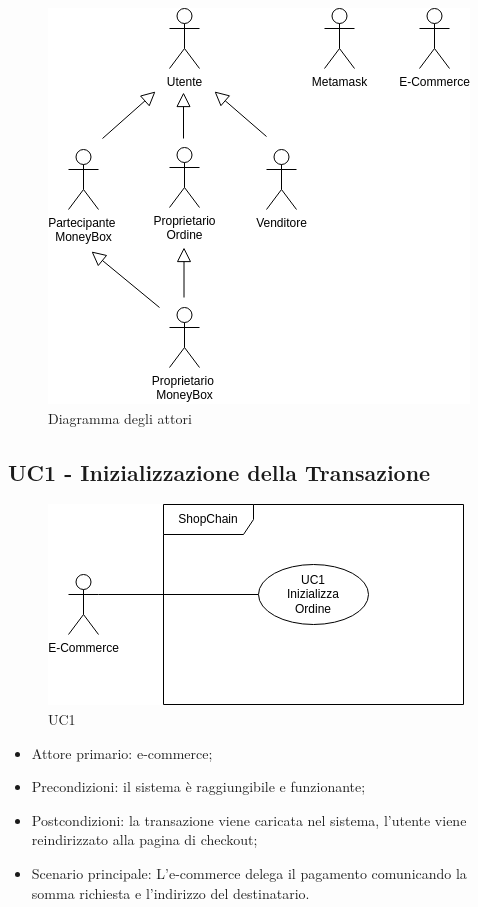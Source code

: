 \begin{figure}[H]
    \centering
    \includegraphics[scale=0.7]{immagini/Attori.png}
    \caption{Diagramma degli attori}
\end{figure}

\subsection{UC1 - Inizializzazione della Transazione}\label{subsection: UC1}

\begin{figure}[H]
    \centering
    \includegraphics[scale=0.9]{immagini/UC1.png}
    \caption{UC1}
\end{figure}

\begin{itemize}
    \item Attore primario: e-commerce\glo{};
    \item Precondizioni: il sistema è raggiungibile e funzionante;
    \item Postcondizioni: la transazione viene caricata nel sistema, l'utente viene reindirizzato alla pagina di checkout;
    \item Scenario principale: L'e-commerce\glo{} delega il pagamento comunicando la somma richiesta e l'indirizzo del destinatario.
\end{itemize}

